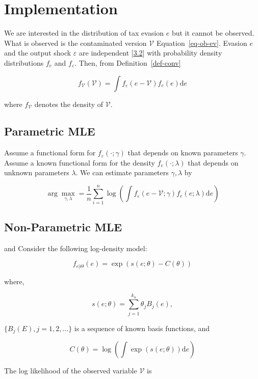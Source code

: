 \documentclass[
  12pt]{article}
\theoremstyle{definition}
\theoremstyle{remark}
\begin{document}
\section{Implementation}\label{implementation}

We are interested in the distribution of tax evasion \(e\) but it cannot
be observed. What is observed is the contaminated version
\(\mathcal{V}\) Equation~\ref{eq-ob-ev}. Evasion \(e\) and the output
shock \(\varepsilon\) are independent {[}\hyperref[ass-ind]{3.2}{]} with
probability density distributions \(f_e\) and \(f_{\varepsilon}\). Then,
from Definition~\ref{def-conv}

\[
f_{\mathcal{V}}(\mathcal{V})=\int f_{\varepsilon}(e-\mathcal{V})f_e(e)\text{d}e
\]

where \(f_{\mathcal{V}}\) denotes the density of \(\mathcal{V}\).

\subsection{Parametric MLE}\label{parametric-mle}

\citet{Chen2007} \citet{Yi2021} Assume a functional form for
\(f_{\varepsilon}(\cdot;\gamma)\) that depends on known parameters
\(\gamma\). Assume a known functional form for the density
\(f_e(\cdot;\lambda)\) that depends on unknown parameters \(\lambda\).
We can estimate parameters \(\gamma, \lambda\) by

\[
\arg \max_{\gamma,\lambda}=\frac{1}{n}\sum_{i=1}^n \log \left(\int f_{\varepsilon}(e-\mathcal{V};\gamma)f_e(e;\lambda)\text{d}e\right)
\]

\subsection{Non-Parametric MLE}\label{non-parametric-mle}

\citet{Chen2007} and \citet{Kang2021} Consider the following log-density
model:

\[
f_{e|\Theta}(e)=\exp(s(e;\theta)-C(\theta))
\]

where,

\[
s(e;\theta)=\sum_{j=1}^{k_n}\theta_j B_j(e),
\]

\(\{B_j(E), j=1,2,\dots\}\) is a sequence of known basis functions, and

\[
C(\theta) = \log\left(\int \exp(s(e;\theta)) \text{d}e \right)
\]

The log likelihood of the observed variable \(\mathcal{V}\) is
\end{document}
